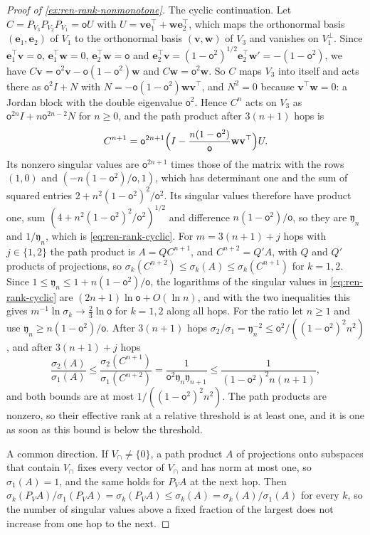 \begin{proof}[Proof of \cref{ex:ren-rank-nonmonotone}]
The cyclic continuation. Let $C=P_{V_3}P_{V_2}P_{V_1}=\mathsf oU$ with $U=\mathbf v\mathbf e_1^\top+\mathbf w\mathbf e_2^\top$, which maps the orthonormal basis $(\mathbf e_1,\mathbf e_2)$ of $V_1$ to the orthonormal basis $(\mathbf v,\mathbf w)$ of $V_3$ and vanishes on $V_1^\perp$. Since $\mathbf e_1^\top\mathbf v=\mathsf o$, $\mathbf e_1^\top\mathbf w=0$, $\mathbf e_2^\top\mathbf w=\mathsf o$ and $\mathbf e_2^\top\mathbf v=(1-\mathsf o^2)^{1/2}\mathbf e_2^\top\mathbf w'=-(1-\mathsf o^2)$, we have $C\mathbf v=\mathsf o^2\mathbf v-\mathsf o(1-\mathsf o^2)\mathbf w$ and $C\mathbf w=\mathsf o^2\mathbf w$. So $C$ maps $V_3$ into itself and acts there as $\mathsf o^2I+N$ with $N=-\mathsf o(1-\mathsf o^2)\mathbf w\mathbf v^\top$, and $N^2=0$ because $\mathbf v^\top\mathbf w=0$: a Jordan block with the double eigenvalue $\mathsf o^2$. Hence $C^n$ acts on $V_3$ as $\mathsf o^{2n}I+n\mathsf o^{2n-2}N$ for $n\ge0$, and the path product after $3(n+1)$ hops is
\[
C^{n+1}=\mathsf o^{2n+1}\Bigl(I-\frac{n(1-\mathsf o^2)}{\mathsf o}\mathbf w\mathbf v^\top\Bigr)U.
\]
Its nonzero singular values are $\mathsf o^{2n+1}$ times those of the matrix with the rows $(1,0)$ and $(-n(1-\mathsf o^2)/\mathsf o,1)$, which has determinant one and the sum of squared entries $2+n^2(1-\mathsf o^2)^2/\mathsf o^2$. Its singular values therefore have product one, sum $(4+n^2(1-\mathsf o^2)^2/\mathsf o^2)^{1/2}$ and difference $n(1-\mathsf o^2)/\mathsf o$, so they are $\mathfrak y_n$ and $1/\mathfrak y_n$, which is \eqref{eq:ren-rank-cyclic}. For $m=3(n+1)+j$ hops with $j\in\{1,2\}$ the path product is $A=QC^{n+1}$, and $C^{n+2}=Q'A$, with $Q$ and $Q'$ products of projections, so $\sigma_k(C^{n+2})\le\sigma_k(A)\le\sigma_k(C^{n+1})$ for $k=1,2$. Since $1\le\mathfrak y_n\le1+n(1-\mathsf o^2)/\mathsf o$, the logarithms of the singular values in \eqref{eq:ren-rank-cyclic} are $(2n+1)\ln\mathsf o+O(\ln n)$, and with the two inequalities this gives $m^{-1}\ln\sigma_k\to\frac23\ln\mathsf o$ for $k=1,2$ along all hops. For the ratio let $n\ge1$ and use $\mathfrak y_n\ge n(1-\mathsf o^2)/\mathsf o$. After $3(n+1)$ hops $\sigma_2/\sigma_1=\mathfrak y_n^{-2}\le\mathsf o^2/((1-\mathsf o^2)^2n^2)$, and after $3(n+1)+j$ hops
\[
\frac{\sigma_2(A)}{\sigma_1(A)}\le\frac{\sigma_2(C^{n+1})}{\sigma_1(C^{n+2})}=\frac1{\mathsf o^2\mathfrak y_n\mathfrak y_{n+1}}\le\frac1{(1-\mathsf o^2)^2n(n+1)},
\]
and both bounds are at most $1/((1-\mathsf o^2)^2n^2)$. The path products are nonzero, so their effective rank at a relative threshold is at least one, and it is one as soon as this bound is below the threshold.

A common direction. If $V_\cap\ne\{0\}$, a path product $A$ of projections onto subspaces that contain $V_\cap$ fixes every vector of $V_\cap$ and has norm at most one, so $\sigma_1(A)=1$, and the same holds for $P_VA$ at the next hop. Then $\sigma_k(P_VA)/\sigma_1(P_VA)=\sigma_k(P_VA)\le\sigma_k(A)=\sigma_k(A)/\sigma_1(A)$ for every $k$, so the number of singular values above a fixed fraction of the largest does not increase from one hop to the next.
\end{proof}


